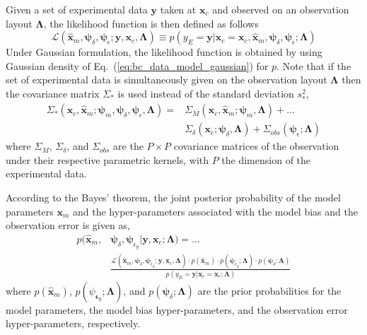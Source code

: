 Given a set of experimental data $\mathbf{y}$ taken at $\mathbf{x}_c$ and observed on an observation layout $\bm{\Lambda}$,
the likelihood function is then defined as follows
\begin{equation}
  \mathcal{L}(\hat{\bm{x}}_m, \bm{\psi}_\delta, \bm{\psi}_\epsilon; \mathbf{y}, \mathbf{x}_c, \bm{\Lambda}) \equiv p(y_E = \mathbf{y} | \bm{x}_c = \mathbf{x}_c, \hat{\bm{x}}_m, \bm{\psi}_\delta, \bm{\psi}_{\epsilon} ; \bm{\Lambda})
\label{eq:bc_likelihood}
\end{equation}
Under Gaussian formulation, the likelihood function is obtained by using Gaussian density of Eq.~(\ref{eq:bc_data_model_gaussian}) for $p$.
Note that if the set of experimental data is simultaneously given on the observation layout $\bm{\Lambda}$ then the covariance matrix $\Sigma_*$ is used instead of the standard deviation $s^2_*$,
\begin{equation}
	\begin{split}
	\Sigma_*(\bm{x}_c, \hat{\bm{x}}_m; \bm{\psi}_m, \bm{\psi}_\delta, \bm{\psi}_\epsilon, \bm{\Lambda}) = & \Sigma_M(\bm{x}_c, \hat{\bm{x}}_m; \bm{\psi}_{m}, \bm{\Lambda}) + \ldots \\ 
	& \Sigma_\delta(\bm{x}_c; \bm{\psi}_\delta, \bm{\Lambda}) + \Sigma_{obs}(\bm{\psi}_\epsilon; \bm{\Lambda})
	\end{split}
\label{eq:bc_gaussian_covariance_matrix}
\end{equation}
where $\Sigma_M$, $\Sigma_\delta$, and $\Sigma_{obs}$ are the $P \times P$ covariance matrices of the observation under their respective parametric kernels, with $P$ the dimension of the experimental data.

According to the Bayes' theorem, the joint posterior probability of the model parameters $\bm{x}_m$ and
the hyper-parameters associated with the model bias and the observation error is given as, 
\begin{equation}
	\begin{split}
  p(\hat{\bm{x}}_m, & \bm{\psi}_\delta, \bm{\psi}_{\epsilon_y} | \mathbf{y}, \mathbf{x}_c; \bm{\Lambda}) = \ldots \\
	& \frac{\mathcal{L}(\hat{\bm{x}}_m, \bm{\psi}_\delta, \bm{\psi}_{\epsilon_y} ; \mathbf{y}, \mathbf{x}_c, \bm{\Lambda}) \cdot p(\hat{\bm{x}}_m) \cdot p(\bm{\psi}_{\epsilon_y}; \bm{\Lambda}) \cdot p(\bm{\psi}_{\delta}; \bm{\Lambda})}{p(y_E = \mathbf{y} | \bm{x}_c = \mathbf{x}_c ; \bm{\Lambda})}
	\end{split}
\label{eq:bc_joint_posterior}
\end{equation}
where $p(\hat{\bm{x}}_m)$, $p(\psi_{\bm{\epsilon}_y}; \bm{\Lambda})$, and $p(\bm{\psi}_{\delta}; \bm{\Lambda})$ are the prior probabilities for the model parameters, the model bias hyper-parameters, and the observation error hyper-parameters, respectively.

